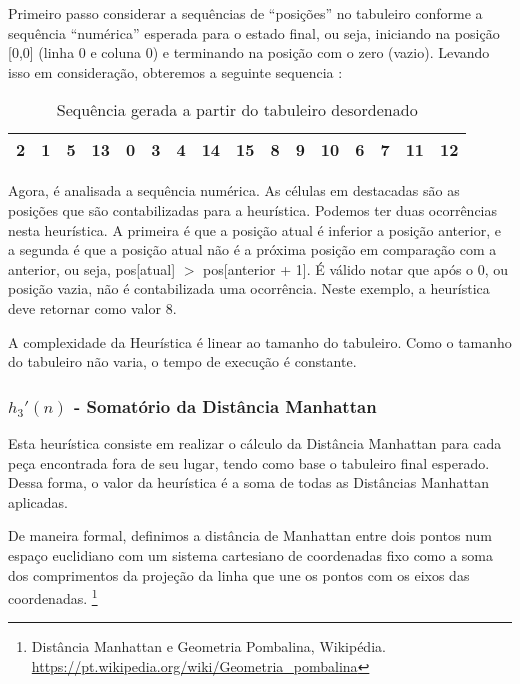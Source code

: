 \documentclass[12pt]{article}
\begin{document}
Primeiro passo considerar a sequências de “posições” no tabuleiro conforme a sequência “numérica” esperada para o estado final, ou seja, iniciando na posição [0,0] (linha 0 e coluna 0) e terminando na posição com o zero (vazio). Levando isso em consideração, obteremos a seguinte sequencia : 

\begin{table}[H]
    \centering
    \begin{tabular}{|c|c|c|c|c|c|c|c|c|c|c|c|c|c|c|c|}
        \hline
        2 & \cellcolor{yellow!25}1 & \cellcolor{yellow!25}5 & \cellcolor{yellow!25}13 & \cellcolor{yellow!25}0 & 3 & 4 & \cellcolor{yellow!25}14 & 15 & \cellcolor{yellow!25}8 & 9 & 10 & \cellcolor{yellow!25}6 & 7 & \cellcolor{yellow!25}11 & 12 \\ \hline
    \end{tabular}
    \caption{Sequência gerada a partir do tabuleiro desordenado}
    \label{tab4}
\end{table}

Agora, é analisada a sequência numérica. As células em destacadas são as posições que são contabilizadas para a heurística. Podemos ter duas ocorrências nesta heurística. A primeira é que a posição atual é inferior a posição anterior, e a segunda é que a posição atual não é a próxima posição em comparação com a anterior, ou seja, pos[atual] $>$ pos[anterior + 1]. É válido notar que após o 0, ou posição vazia, não é contabilizada uma ocorrência. Neste exemplo, a heurística deve retornar como valor 8.

A complexidade da Heurística é linear ao tamanho do tabuleiro. Como o tamanho do tabuleiro não varia, o tempo de execução é constante.

\subsubsection{$h_{3}'(n)$ - \textbf{Somatório da Distância Manhattan}}

Esta heurística consiste em realizar o cálculo da Distância Manhattan para cada peça encontrada fora de seu lugar, tendo como base o tabuleiro final esperado. Dessa forma, o valor da heurística é a soma de todas as Distâncias Manhattan aplicadas.

De maneira formal, definimos a distância de Manhattan entre dois pontos num espaço euclidiano com um sistema cartesiano de coordenadas fixo como a soma dos comprimentos da projeção da linha que une os pontos com os eixos das coordenadas. \footnote{Distância Manhattan e Geometria Pombalina, Wikipédia. \url{https://pt.wikipedia.org/wiki/Geometria_pombalina}}
\end{document}
